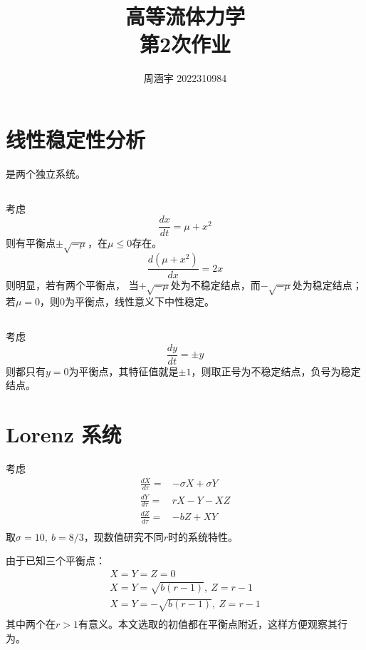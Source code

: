 \documentclass[UTF8,zihao=5]{ctexart} %
\title{{\bfseries\rmfamily\Huge{高等流体力学\hspace{1em}\\第2次作业}}}
\author{周涵宇 2022310984}
\date{}
\begin{document}
\maketitle
\thispagestyle{fancy}



\section{线性稳定性分析}

是两个独立系统。

\subsection{}
考虑
$$
    \frac{dx}{dt} = \mu + x^2
$$
则有平衡点$\pm\sqrt{-\mu}$，在$\mu\leq 0$存在。
$$
    \frac{d(\mu + x^2)}{dx} = 2x
$$
则明显，若有两个平衡点，
当$+\sqrt{-\mu}$处为不稳定结点，而$-\sqrt{-\mu}$处为稳定结点；
若$\mu=0$，则$0$为平衡点，线性意义下中性稳定。

\subsection{}
考虑
$$
    \frac{dy}{dt}=\pm y
$$
则都只有$y=0$为平衡点，其特征值就是$\pm 1$，则取正号为不稳定结点，负号为稳定结点。

\label{sec:1}

\section{Lorenz 系统}

考虑
$$
    \begin{array}{rl}
        \frac{dX}{d\tau}  = & -\sigma X + \sigma Y \\
        \frac{dY}{d\tau}  = & rX - Y - XZ          \\
        \frac{dZ}{d\tau}  = & -bZ + XY             \\
    \end{array}
$$
取$\sigma = 10,\ b=8/3$，现数值研究不同$r$时的系统特性。

由于已知三个平衡点：
$$
    \begin{array}{l}
        X=Y=Z=0                        \\
        X=Y=\sqrt{b(r-1)} , \ Z = r-1  \\
        X=Y=-\sqrt{b(r-1)} , \ Z = r-1 \\
    \end{array}
$$
其中两个在$r>1$有意义。本文选取的初值都在平衡点附近，这样方便观察其行为。
\end{document}
